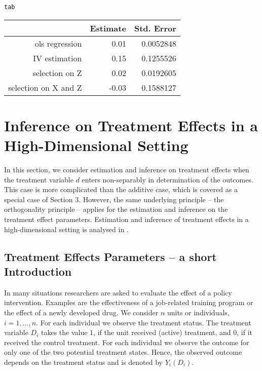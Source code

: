 \documentclass{amsart}\usepackage[]{graphicx}\usepackage[]{color}
\makeatletter
\newcommand{\hlstd}[1]{\textcolor[rgb]{0.345,0.345,0.345}{#1}}%
\newenvironment{kframe}{%
 \def\at@end@of@kframe{}%
 \ifinner\ifhmode%
  \def\at@end@of@kframe{\end{minipage}}%
  \begin{minipage}{\columnwidth}%
 \fi\fi%
 \def\FrameCommand##1{\hskip\@totalleftmargin \hskip-\fboxsep
 \colorbox{shadecolor}{##1}\hskip-\fboxsep
     \hskip-\linewidth \hskip-\@totalleftmargin \hskip\columnwidth}%
 \MakeFramed {\advance\hsize-\width
   \@totalleftmargin\z@ \linewidth\hsize
   \@setminipage}}%
 {\par\unskip\endMakeFramed%
 \at@end@of@kframe}
\makeatother
\begin{document}
\begin{kframe}
\begin{alltt}
\hlstd{tab}
\end{alltt}
\end{kframe}%
\begin{table}[ht]
\centering
\begin{tabular}{rrr}
  \hline
 & Estimate & Std. Error \\ 
  \hline
ols regression & 0.01 & 0.0052848 \\ 
  IV estimation  & 0.15 & 0.1255526 \\ 
  selection on Z & 0.02 & 0.0192605 \\ 
  selection on X and Z & -0.03 & 0.1588127 \\ 
   \hline
\end{tabular}
\end{table}



\section{Inference on Treatment Effects in a High-Dimensional Setting}

In this section, we consider estimation and inference on treatment effects when the treatment variable $d$ enters non-separably in determination of the outcomes. This case is more complicated than the additive case, which is covered as a special case of Section 3. However, the same underlying principle -- the orthogonality principle -- applies for the estimation and inference on the treatment effect parameters. Estimation and inference of treatment effects in a high-dimensional setting is analysed in \citet{BCFH:Policy}.


\subsection{Treatment Effects Parameters -- a short Introduction}

In many situations researchers are asked to evaluate the effect of a policy intervention. Examples are the effectiveness of a job-related training program or the effect of a newly developed drug. We consider $n$ units or individuals, $i=1,\ldots,n$. For each individual we observe the treatment status. The treatment variable $D_i$ takes the value $1$, if the unit received (active) treatment, and $0$, if it received the control treatment. For each individual we observe the outcome for only one of the two potential treatment states. Hence, the observed outcome depends on the treatment status and is denoted by $Y_i(D_i)$. 
\end{document}
